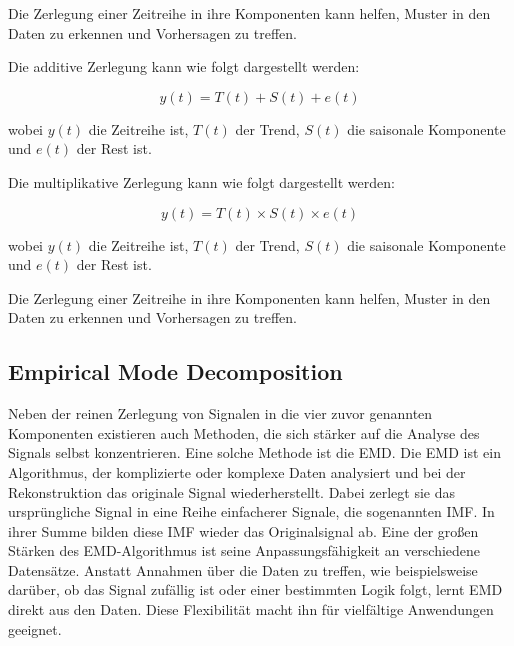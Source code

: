 Die Zerlegung einer Zeitreihe in ihre Komponenten kann helfen, Muster in den Daten zu erkennen und Vorhersagen zu treffen.


Die additive Zerlegung kann wie folgt dargestellt werden:

\begin{equation}
\label{for:additive_decomposition}
y(t) = T(t) + S(t) + e(t)
\end{equation}

wobei \(y(t)\) die Zeitreihe ist, \(T(t)\) der Trend, \(S(t)\) die saisonale Komponente und \(e(t)\) der Rest ist.

Die multiplikative Zerlegung kann wie folgt dargestellt werden:

\begin{equation}
\label{for:multiplicative_decomposition}
y(t) = T(t) \times S(t) \times e(t)
\end{equation}

wobei \(y(t)\) die Zeitreihe ist, \(T(t)\) der Trend, \(S(t)\) die saisonale Komponente und \(e(t)\) der Rest ist.

Die Zerlegung einer Zeitreihe in ihre Komponenten kann helfen, Muster in den Daten zu erkennen und Vorhersagen zu treffen.


\subsection{Empirical Mode Decomposition}
\label{techniques:EMD}
Neben der reinen Zerlegung von Signalen in die vier zuvor genannten Komponenten existieren auch Methoden, die sich stärker auf die Analyse des Signals selbst konzentrieren. 
Eine solche Methode ist die \acl{EMD}.
Die \ac{EMD} ist ein Algorithmus, der komplizierte oder komplexe Daten analysiert und bei der Rekonstruktion das originale Signal wiederherstellt. Dabei zerlegt sie das ursprüngliche 
Signal in eine Reihe einfacherer Signale, die sogenannten \acf{IMF}. In ihrer Summe bilden diese IMF wieder das Originalsignal ab.
Eine der großen Stärken des \ac{EMD}-Algorithmus ist seine Anpassungsfähigkeit an verschiedene Datensätze. Anstatt Annahmen über die Daten zu treffen, wie beispielsweise darüber, ob das 
Signal zufällig ist oder einer bestimmten Logik folgt, lernt \ac{EMD} direkt aus den Daten. Diese Flexibilität macht ihn für vielfältige Anwendungen geeignet.

